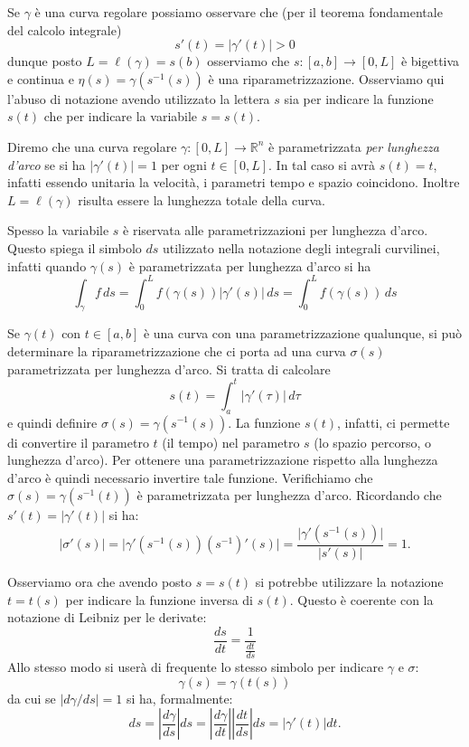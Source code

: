 \documentclass[italian,a4paper,hidelinks]{scrartcl}
\newcommand{\RR}{{\mathbb R}}
\newcommand{\defeq}{=}
\begin{document}
Se $\gamma$ è
una curva regolare possiamo osservare che (per il teorema fondamentale
del calcolo integrale)
\[
s'(t) = |\gamma'(t)| > 0
\]
dunque posto $L=\ell(\gamma)=s(b)$ osserviamo che
$s\colon[a,b]\to[0,L]$ è bigettiva e continua e $\eta(s) =
\gamma(s^{-1}(s))$ è una riparametrizzazione. Osserviamo qui l'abuso
di notazione avendo utilizzato la lettera $s$ sia per indicare la
funzione $s(t)$ che per indicare la variabile $s=s(t)$.

Diremo che una curva regolare $\gamma\colon [0,L]\to \RR^n$
è parametrizzata \emph{per lunghezza
  d'arco} se si ha $\lvert \gamma'(t)\rvert = 1$ per ogni
$t\in[0,L]$.
In tal caso si avrà $s(t)=t$, infatti essendo unitaria la velocità, i
parametri tempo e spazio coincidono. Inoltre $L=\ell(\gamma)$ risulta
essere la lunghezza totale della curva.

Spesso la variabile $s$ è riservata alle parametrizzazioni per
lunghezza d'arco. Questo spiega
il simbolo $ds$ utilizzato nella notazione degli
integrali curvilinei, infatti
quando $\gamma(s)$ è parametrizzata per lunghezza d'arco
si ha
\[
  \int_\gamma f\, ds = \int_0^L f(\gamma(s))\lvert \gamma'(s)\rvert\,
  ds
 = \int_0^L f(\gamma(s))\, ds
\]

Se $\gamma(t)$ con $t\in[a,b]$ è una curva con una parametrizzazione qualunque, si può
determinare la riparametrizzazione che ci porta ad una curva
$\sigma(s)$ parametrizzata per lunghezza d'arco. Si tratta di
calcolare
\[
  s(t) = \int_a^t \lvert\gamma'(\tau)\rvert\, d\tau
\]
e quindi definire $\sigma(s) \defeq \gamma(s^{-1}(s))$. La funzione
$s(t)$, infatti, ci permette di convertire il parametro $t$ (il tempo)
nel parametro $s$ (lo spazio percorso, o lunghezza d'arco). Per ottenere una
parametrizzazione rispetto alla lunghezza d'arco è quindi necessario
invertire tale funzione. Verifichiamo che $\sigma(s)=\gamma(s^{-1}(t))$ è parametrizzata
per lunghezza d'arco. Ricordando che
$s'(t) = \lvert \gamma'(t)\rvert$ si ha:
\[
\lvert \sigma'(s) \rvert = \lvert \gamma'(s^{-1}(s))
(s^{-1})'(s)\rvert  = \frac{\lvert \gamma'(s^{-1}(s))\rvert}{\lvert
  s'(s)\rvert}
= 1.
\]

Osserviamo ora che avendo posto $s=s(t)$ si potrebbe utilizzare la
notazione $t=t(s)$ per indicare la funzione inversa di $s(t)$.
Questo è coerente con la
notazione di Leibniz per le derivate:
\[
  \frac{ds}{dt} = \frac{1}{\frac{dt}{ds}}
\]
Allo stesso modo si userà di frequente lo stesso simbolo per indicare
$\gamma$ e $\sigma$:
\[
  \gamma(s) \defeq \gamma(t(s))
\]
da cui se $\lvert d\gamma/ds \rvert = 1$ si ha, formalmente:
\[
  ds = \left| \frac{d\gamma}{ds}\right| ds =
  \left|\frac{d\gamma}{dt}\right| \left|\frac{dt}{ds}\right| ds =
  \lvert \gamma'(t)\rvert dt.
\]
\end{document}
